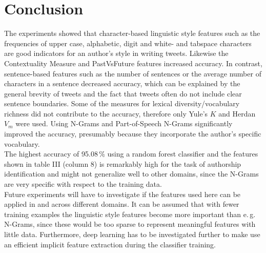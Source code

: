 \documentclass[journal, a4paper, 12pt]{IEEEtran}
\begin{document}
\section{Conclusion}
The experiments showed that character-based linguistic style features such as the frequencies of upper case, alphabetic, digit and white- and tabspace characters are good indicators for an author's style in writing tweets. Likewise the Contextuality Measure and PastVsFuture features increased accuracy. In contrast, sentence-based features such as the number of sentences or the average number of characters in a sentence decreased accuracy, which can be explained by the general brevity of tweets and the fact that tweets often do not include clear sentence boundaries. Some of the measures for lexical diversity/vocabulary richness did not contribute to the accuracy, therefore only Yule's $K$ and Herdan $V_m$ were used. Using N-Grams and Part-of-Speech N-Grams significantly improved the accuracy, presumably because they incorporate the author's specific vocabulary.\\
The highest accuracy of 95.08\,\% using a random forest classifier and the features shown in table III (column 8) is remarkably high for the task of authorship identification and might not generalize well to other domains, since the N-Grams are very specific with respect to the training data.\\
Future experiments will have to investigate if the features used here can be applied in and across different domains. It can be assumed that with fewer training examples the linguistic style features become more important than e.\,g. N-Grams, since these would be too sparse to represent meaningful features with little data. Furthermore, deep learning has to be investigated further to make use an efficient implicit feature extraction during the classifier training.
\end{document}
